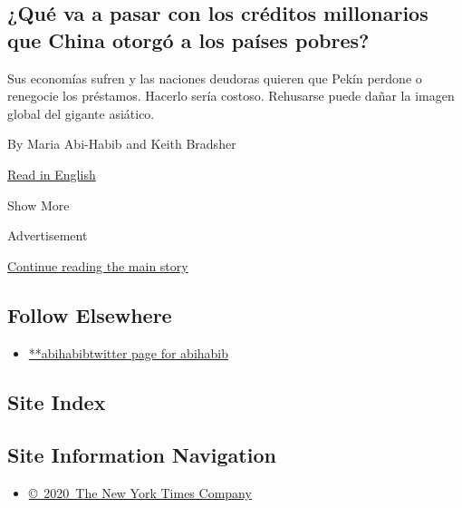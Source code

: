 \begin{enumerate}
  \hypertarget{quuxe9-va-a-pasar-con-los-cruxe9ditos-millonarios-que-china-otorguxf3-a-los-pauxedses-pobres}{%
  \subsection{¿Qué va a pasar con los créditos millonarios que China
  otorgó a los países
  pobres?}\label{quuxe9-va-a-pasar-con-los-cruxe9ditos-millonarios-que-china-otorguxf3-a-los-pauxedses-pobres}}

  Sus economías sufren y las naciones deudoras quieren que Pekín perdone
  o renegocie los préstamos. Hacerlo sería costoso. Rehusarse puede
  dañar la imagen global del gigante asiático.

  By Maria Abi-Habib and Keith Bradsher

  \href{https://www.nytimes.com/2020/05/18/business/china-loans-coronavirus-belt-road.html}{Read
  in English}
\end{enumerate}

Show More

Advertisement

\protect\hyperlink{after-mid2}{Continue reading the main story}

\hypertarget{follow-elsewhere}{%
\subsection{Follow Elsewhere}\label{follow-elsewhere}}

\begin{itemize}
\tightlist
\item
  \href{https://twitter.com/abihabib}{**abihabibtwitter page for
  abihabib}
\end{itemize}

\hypertarget{site-index}{%
\subsection{Site Index}\label{site-index}}

\hypertarget{site-information-navigation}{%
\subsection{Site Information
Navigation}\label{site-information-navigation}}

\begin{itemize}
\tightlist
\item
  \href{https://help.nytimes.com/hc/en-us/articles/115014792127-Copyright-notice}{©~2020~The
  New York Times Company}
\end{itemize}

